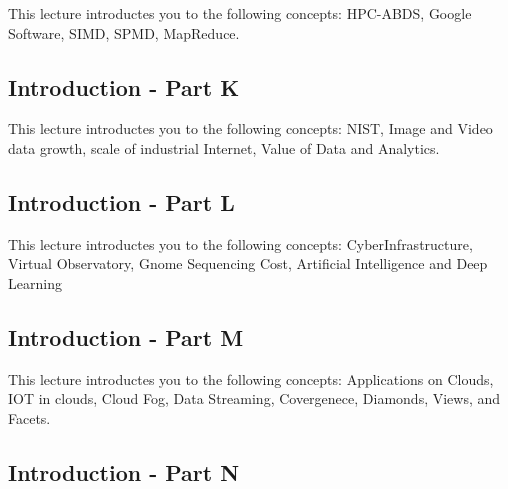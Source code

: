 This lecture introductes you to the following concepts: HPC-ABDS, Google Software,
SIMD, SPMD, MapReduce.

\subsection{Introduction - Part K}\label{s:cloud-fundamentals-k}

This lecture introductes you to the following concepts: NIST, Image and Video data growth,
scale of industrial Internet, Value of Data and Analytics. 

\subsection{Introduction - Part L}\label{s:cloud-fundamentals-l}

This lecture introductes you to the following concepts: CyberInfrastructure, 
Virtual Observatory, Gnome Sequencing Cost, Artificial Intelligence and Deep 
Learning

\subsection{Introduction - Part M}\label{s:cloud-fundamentals-m}

This lecture introductes you to the following concepts: Applications on Clouds,
IOT in clouds, Cloud Fog, Data Streaming, Covergenece, Diamonds, Views, and Facets.

\subsection{Introduction - Part N}\label{s:cloud-fundamentals-n}

